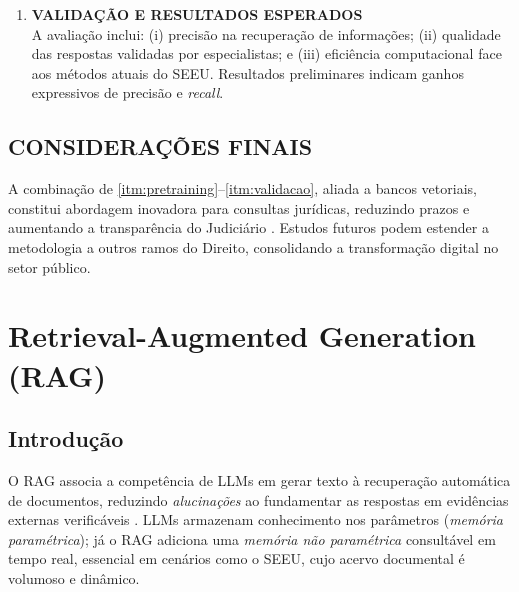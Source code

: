 \begin{description}
\begin{enumerate}[label=\textbf{2.\arabic*}, leftmargin=*]
  \item \textbf{VALIDAÇÃO E RESULTADOS ESPERADOS}\label{itm:validacao}\\
        A avaliação inclui: (i) precisão na recuperação de informações;
        (ii) qualidade das respostas validadas por especialistas; e
        (iii) eficiência computacional face aos métodos atuais do SEEU.
        Resultados preliminares indicam ganhos expressivos de precisão e
        \textit{recall}.
\end{enumerate}

\subsection*{CONSIDERAÇÕES FINAIS}
A combinação de \ref{itm:pretraining}–\ref{itm:validacao}, aliada a bancos
vetoriais, constitui abordagem inovadora para consultas jurídicas, reduzindo
prazos e aumentando a transparência do Judiciário
\cite{belarmino2025aplicacao,divald2021eformalization}. Estudos futuros podem
estender a metodologia a outros ramos do Direito, consolidando a transformação
digital no setor público.

\section{Retrieval-Augmented Generation (RAG)}
\label{sec:rag}

\subsection{Introdução}
O RAG associa a competência de LLMs em gerar texto à recuperação automática de
documentos, reduzindo \textit{alucinações} ao fundamentar as respostas em
evidências externas verificáveis
\cite{lewis2020rag,gao2023survey,edwards2024hybrid,pujiono2024implementing}.
LLMs armazenam conhecimento nos parâmetros (\emph{memória paramétrica}); já o
RAG adiciona uma \emph{memória não paramétrica} consultável em tempo real,
essencial em cenários como o SEEU, cujo acervo documental é volumoso e
dinâmico.


\end{description}
